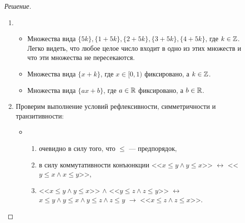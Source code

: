     \begin{proof}[Решение]
        \begin{enumerate}[label=(\alph{*})]
            \item \begin{itemize}
                \item Множества вида \(\{5k\}, \{1 + 5k\}, \{2 + 5k\}, \{3 + 5k\}, \{4 + 5k\}\), где \(k \in \mathbb{Z}\). Легко видеть, что любое целое число входит в одно из этих множеств и что эти множества не пересекаются.
                \item Множества вида \(\{x + k\}\), где \(x \in [0, 1)\) фиксировано, а \(k \in \mathbb{Z}\).
                \item Множества вида \(\{ax + b\}\), где \(a \in \mathbb{R}\) фиксировано, а \(b \in \mathbb{R}\).
            \end{itemize}
            \item Проверим выполнение условий рефлексивности, симметричности и транзитивности:
            \begin{itemize}
                \item \begin{enumerate}[label=\arabic{*})]
                    \item очевидно в силу того, что \(\leqslant\) --- предпорядок,
                    \item в силу коммутативности конъюнкции <<\(x \leqslant y \land y \leqslant x\)>> \(\leftrightarrow\) <<\(y \leqslant x \land x \leqslant y\)>>,
                    \item <<\(x \leqslant y \land y \leqslant x\)>> \(\land\) <<\(y \leqslant z \land z \leqslant y\)>> \(\leftrightarrow\) \(x \leqslant y \land y \leqslant x \land y \leqslant z \land z \leqslant y\) \(\to\) <<\(x \leqslant z \land z \leqslant x\)>>.
                \end{enumerate}
            \end{itemize}
        \end{enumerate}
    \end{proof}
